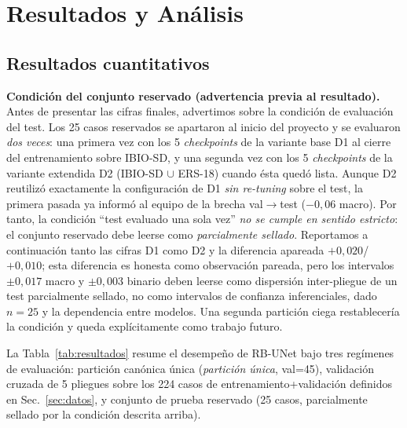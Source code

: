 \documentclass[conference]{IEEEtran}
\begin{document}
\section{Resultados y Análisis}
\label{sec:resultados}

\subsection{Resultados cuantitativos}
\label{sec:resultados-cuant}

\textbf{Condición del conjunto reservado (advertencia previa al resultado).} Antes de presentar las cifras finales, advertimos sobre la condición de evaluación del test. Los 25 casos reservados se apartaron al inicio del proyecto y se evaluaron \emph{dos veces}: una primera vez con los 5 \emph{checkpoints} de la variante base D1 al cierre del entrenamiento sobre IBIO-SD, y una segunda vez con los 5 \emph{checkpoints} de la variante extendida D2 (IBIO-SD $\cup$ ERS-18) cuando ésta quedó lista. Aunque D2 reutilizó exactamente la configuración de D1 \emph{sin re-tuning} sobre el test, la primera pasada ya informó al equipo de la brecha val$\rightarrow$test ($-0{,}06$ macro). Por tanto, la condición ``test evaluado una sola vez'' \emph{no se cumple en sentido estricto}: el conjunto reservado debe leerse como \emph{parcialmente sellado}. Reportamos a continuación tanto las cifras D1 como D2 y la diferencia apareada $+0{,}020$/$+0{,}010$; esta diferencia es honesta como observación pareada, pero los intervalos $\pm 0{,}017$ macro y $\pm 0{,}003$ binario deben leerse como dispersión inter-pliegue de un test parcialmente sellado, no como intervalos de confianza inferenciales, dado $n=25$ y la dependencia entre modelos. Una segunda partición ciega restablecería la condición y queda explícitamente como trabajo futuro.

La Tabla~\ref{tab:resultados} resume el desempeño de RB-UNet bajo tres regímenes de evaluación: partición canónica única (\emph{partición única}, val=45), validación cruzada de 5 pliegues sobre los 224 casos de entrenamiento+validación definidos en Sec.~\ref{sec:datos}, y conjunto de prueba reservado (25 casos, parcialmente sellado por la condición descrita arriba).
\end{document}
